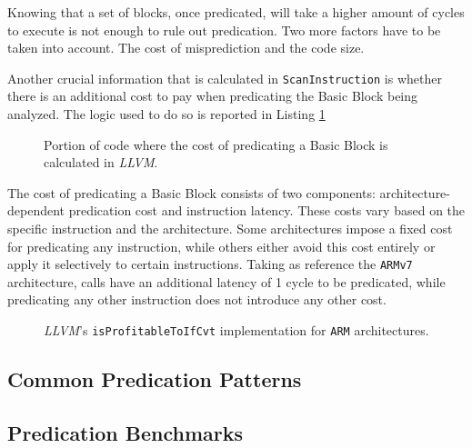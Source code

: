 Knowing that a set of blocks, once predicated, will take a higher amount of cycles to execute is not enough to rule out predication. Two more factors have to be taken into account. The cost of misprediction and the code size.

Another crucial information that is calculated in \texttt{ScanInstruction} is whether there is an additional cost to pay when predicating the Basic Block being analyzed. The logic used to do so is reported in Listing \ref{lst:predication_cost}

\begin{figure}[H]
    \centering
    
    \caption{Portion of code where the cost of predicating a Basic Block is calculated in \textit{LLVM}.}
    \label{lst:predication_cost}
\end{figure}

The cost of predicating a Basic Block consists of two components: architecture-dependent predication cost and instruction latency. These costs vary based on the specific instruction and the architecture. Some architectures impose a fixed cost for predicating any instruction, while others either avoid this cost entirely or apply it selectively to certain instructions. Taking as reference the \texttt{ARMv7} architecture, calls have an additional latency of 1 cycle to be predicated, while predicating any other instruction does not introduce any other cost.

\begin{figure}[H]
    \centering
    
    \caption{\textit{LLVM}'s \texttt{isProfitableToIfCvt} implementation for \texttt{ARM} architectures.}
    \label{fig:predications_heuristic}
\end{figure}

\subsection{Common Predication Patterns}
\label{sec:common_predication_patterns}


\subsection{Predication Benchmarks}
\label{sec:predication_benchmark}

\newpage